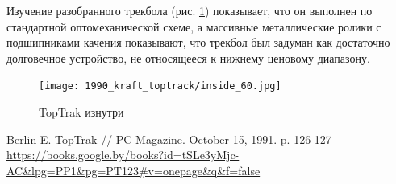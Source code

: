 \documentclass[11pt, a4paper]{article}
\begin{document}
Изучение разобранного трекбола (рис. \ref{fig:TopTrakInside}) показывает, что он выполнен по стандартной оптомеханической схеме, а массивные металлические ролики с подшипниками качения показывают, что трекбол был задуман как достаточно долговечное устройство, не относящееся к нижнему ценовому диапазону.

\begin{figure}[h]
    \centering
    \texttt{[image: 1990\_kraft\_toptrack/inside\_60.jpg]}
    \caption{TopTrak изнутри}
    \label{fig:TopTrakInside}
\end{figure}

\begin{thebibliography}{9}
 Berlin E. TopTrak // PC Magazine. October 15, 1991. p. 126-127 \url{https://books.google.by/books?id=tSLe3yMjc-AC&lpg=PP1&pg=PT123#v=onepage&q&f=false}
\end{thebibliography}
\end{document}
